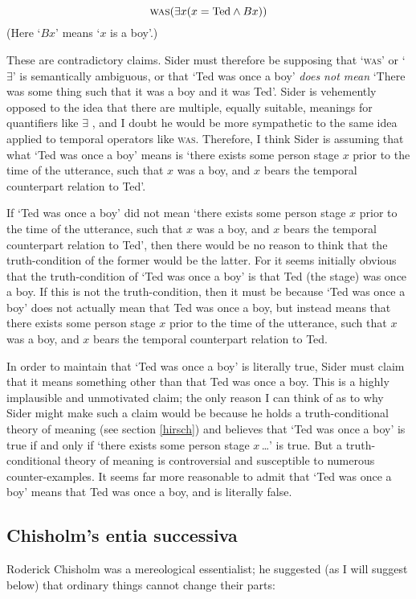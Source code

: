 \documentclass[11pt]{article}
\begin{document}
\begin{spacing}{1.5}
\begin{displaymath}
\textsc{was} (\exists x ( x = \text{Ted} \wedge Bx ))
\end{displaymath}
(Here `$Bx$' means `$x$ is a boy'.)

These are contradictory claims.  Sider must therefore be supposing
that `\textsc{was}' or `$\exists$' is semantically ambiguous, or that
`Ted was once a boy' {\em does not mean} `There was some thing such
that it was a boy and it was Ted'.  Sider is vehemently opposed to the
idea that there are multiple, equally suitable, meanings for
quantifiers like $\exists$
\citeyearpar{sider2001,sider2011b,sider2011d}, and I doubt he would be
more sympathetic to the same idea applied to temporal operators like
\textsc{was}.  Therefore, I think Sider is assuming that what `Ted was
once a boy' means is `there exists some person stage $x$ prior to the
time of the utterance, such that $x$ was a boy, and $x$ bears the
temporal counterpart relation to Ted'.

If `Ted was once a boy' did not mean `there exists some person stage
$x$ prior to the time of the utterance, such that $x$ was a boy, and
$x$ bears the temporal counterpart relation to Ted', then there would
be no reason to think that the truth-condition of the former would be
the latter.  For it seems initially obvious that the truth-condition of
`Ted was once a boy' is that Ted (the stage) was once a boy.  If this
is not the truth-condition, then it must be because `Ted was once a
boy' does not actually mean that Ted was once a boy, but instead means
that there exists some person stage $x$ prior to the time of the
utterance, such that $x$ was a boy, and $x$ bears the temporal
counterpart relation to Ted.

In order to maintain that `Ted was once a boy' is literally true,
Sider must claim that it means something other than that Ted was once
a boy.  This is a highly implausible and unmotivated claim; the only
reason I can think of as to why Sider might make such a claim would be
because he holds a truth-conditional theory of meaning (see section
\ref{hirsch}) and believes that `Ted was once a boy' is true if and
only if `there exists some person stage $x$\,\ldots ' is true.  But a
truth-conditional theory of meaning is controversial and susceptible
to numerous counter-examples.  It seems far more reasonable to admit
that `Ted was once a boy' means that Ted was once a boy, and is
literally false.

\subsection{Chisholm's entia successiva}
\label{chisholm}
Roderick Chisholm was a mereological essentialist; he suggested (as I
will suggest below) that ordinary things cannot change their parts:


\end{spacing}
\end{document}
